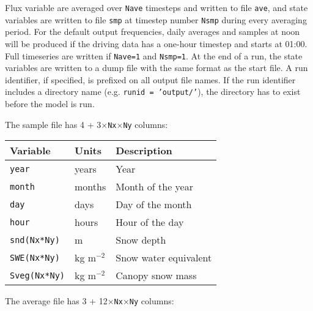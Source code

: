 \documentclass{article}
\begin{document}
Flux variable are averaged over {\tt Nave} timesteps and written to file {\tt ave}, and state variables are written to file {\tt smp} at timestep number {\tt Nsmp} during every averaging period. For the default output frequencies, daily averages and samples at noon will be produced if the driving data has a one-hour timestep and starts at 01:00. Full timeseries are written if {\tt Nave=1} and {\tt Nsmp=1}. At the end of a run, the state variables are written to a dump file with the same format as the start file. A run identifier, if specified, is prefixed on all output file names. If the run identifier includes a directory name (e.g. {\tt runid = 'output/'}), the directory has to exist before the model is run.

The sample file has 4 + 3$\times${\tt Nx$\times$Ny} columns:

\begin{tabular}{|l|l|l|}
\hline
Variable & Units & Description \\
\hline
{\tt year}        & years       & Year                  \\
{\tt month}       & months      & Month of the year     \\
{\tt day}         & days        & Day of the month      \\
{\tt hour}        & hours       & Hour of the day       \\
{\tt snd(Nx*Ny)}  & m           & Snow depth            \\
{\tt SWE(Nx*Ny)}  & kg m$^{-2}$ & Snow water equivalent \\
{\tt Sveg(Nx*Ny)} & kg m$^{-2}$ & Canopy snow mass      \\
\hline 
\end{tabular}

The average file has 3 + 12$\times${\tt Nx$\times$Ny} columns:
\end{document}
